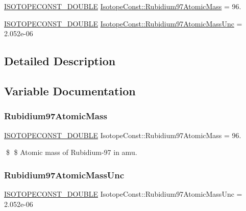 \begin{DoxyCompactItemize}
\item 
\mbox{\hyperlink{group___isotope_const-_macros_ga8f45a7272ce02c0b4c65c44636ed719a}{I\+S\+O\+T\+O\+P\+E\+C\+O\+N\+S\+T\+\_\+\+D\+O\+U\+B\+LE}} \mbox{\hyperlink{group___isotope_const-_rubidium-_rb97_ga5629aee5f5282daab85a8a5a61923904}{Isotope\+Const\+::\+Rubidium97\+Atomic\+Mass}} = 96.
\item 
\mbox{\hyperlink{group___isotope_const-_macros_ga8f45a7272ce02c0b4c65c44636ed719a}{I\+S\+O\+T\+O\+P\+E\+C\+O\+N\+S\+T\+\_\+\+D\+O\+U\+B\+LE}} \mbox{\hyperlink{group___isotope_const-_rubidium-_rb97_ga6fef64d7074040c133cc398f33bfd31b}{Isotope\+Const\+::\+Rubidium97\+Atomic\+Mass\+Unc}} = 2.\+052e-\/06
\end{DoxyCompactItemize}


\subsection{Detailed Description}


\subsection{Variable Documentation}
\mbox{\label{group___isotope_const-_rubidium-_rb97_ga5629aee5f5282daab85a8a5a61923904}} 
\subsubsection{\texorpdfstring{Rubidium97\+Atomic\+Mass}{Rubidium97AtomicMass}}
{\footnotesize\ttfamily \mbox{\hyperlink{group___isotope_const-_macros_ga8f45a7272ce02c0b4c65c44636ed719a}{I\+S\+O\+T\+O\+P\+E\+C\+O\+N\+S\+T\+\_\+\+D\+O\+U\+B\+LE}} Isotope\+Const\+::\+Rubidium97\+Atomic\+Mass = 96.}

\$ \$ Atomic mass of Rubidium-\/97 in amu. \mbox{\label{group___isotope_const-_rubidium-_rb97_ga6fef64d7074040c133cc398f33bfd31b}} 
\subsubsection{\texorpdfstring{Rubidium97\+Atomic\+Mass\+Unc}{Rubidium97AtomicMassUnc}}
{\footnotesize\ttfamily \mbox{\hyperlink{group___isotope_const-_macros_ga8f45a7272ce02c0b4c65c44636ed719a}{I\+S\+O\+T\+O\+P\+E\+C\+O\+N\+S\+T\+\_\+\+D\+O\+U\+B\+LE}} Isotope\+Const\+::\+Rubidium97\+Atomic\+Mass\+Unc = 2.\+052e-\/06}

